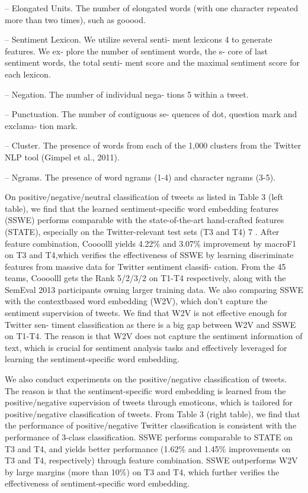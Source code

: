 -- Elongated Units. The number of elongated
words (with one character repeated more than
two times), such as gooood.

-- Sentiment Lexicon. We utilize several senti-
ment lexicons 4 to generate features. We ex-
plore the number of sentiment words, the s-
core of last sentiment words, the total senti-
ment score and the maximal sentiment score
for each lexicon.

-- Negation. The number of individual nega-
tions 5 within a tweet.

-- Punctuation. The number of contiguous se-
quences of dot, question mark and exclama-
tion mark.

-- Cluster. The presence of words from each
of the 1,000 clusters from the Twitter NLP
tool (Gimpel et al., 2011).

-- Ngrams. The presence of word ngrams (1-4)
and character ngrams (3-5).

On positive/negative/neutral classification of tweets as listed in
Table 3 (left table), we find that the learned sentiment-specific word
embedding features (SSWE) performs comparable with the
state-of-the-art hand-crafted features (STATE), especially on the
Twitter-relevant test sets (T3 and T4) 7 . After feature combination,
Coooolll yields 4.22\% and 3.07\% improvement by macroF1 on T3 and
T4,which verifies the effectiveness of SSWE by learning discriminate
features from massive data for Twitter sentiment classifi-
cation. From the 45 teams, Coooolll gets the Rank 5/2/3/2 on T1-T4
respectively, along with the SemEval 2013 participants owning larger
training data. We also comparing SSWE with the contextbased word
embedding (W2V), which don't capture the sentiment supervision of
tweets. We find that W2V is not effective enough for Twitter sen-
timent classification as there is a big gap between W2V and SSWE on
T1-T4. The reason is that W2V does not capture the sentiment
information of text, which is crucial for sentiment analysis tasks and
effectively leveraged for learning the sentiment-specific word
embedding.

We also conduct experiments on the positive/negative classification of
tweets. The reason is that the sentiment-specific word embedding is
learned from the positive/negative supervision of tweets through
emoticons, which is tailored for positive/negative classification of
tweets. From Table 3 (right table), we find that the performance of
positive/negative Twitter classification is consistent with the
performance of 3-class classification. SSWE performs comparable to
STATE on T3 and T4, and yields better performance (1.62\% and 1.45\%
improvements on T3 and T4, respectively) through feature
combination. SSWE outperforms W2V by large margins (more than 10\%)
on T3 and T4, which further verifies the effectiveness of
sentiment-specific word embedding.


